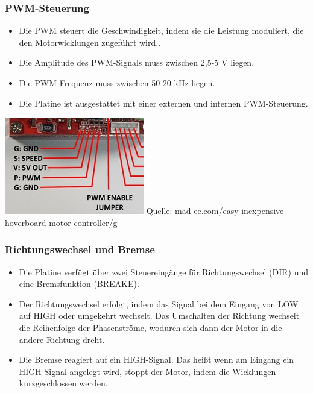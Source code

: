 \documentclass[ngerman,12pt,a4paper]{article}
\begin{document}
		\subsubsection*{PWM-Steuerung}
		\begin{itemize}
			\item Die PWM steuert die Geschwindigkeit, indem sie die Leistung moduliert, die den Motorwicklungen zugeführt wird..
			\item Die Amplitude des PWM-Signals muss zwischen 2,5-5 V liegen.
			\item Die PWM-Frequenz muss zwischen 50-20 kHz liegen.
			\item Die Platine ist ausgestattet mit einer externen und internen PWM-Steuerung.
		\end{itemize}
		
		\begin{center}
			\begin{minipage}{\textwidth}
				\centering
				\includegraphics[scale=1]{Pictures/PWM-Treiber}
				\label{fig:spiffs_init}
				\vspace{-2pt}
				\small Quelle: mad-ee.com/easy-inexpensive-hoverboard-motor-controller/g
			\end{minipage}
		\end{center}
		\newpage
		\subsubsection*{Richtungswechsel und Bremse}
		\begin{itemize}
			\item Die Platine verfügt über zwei Steuereingänge für Richtungswechsel (DIR) und eine Bremsfunktion (BREAKE).
			\item Der Richtungswechsel erfolgt, indem das Signal bei dem Eingang von LOW auf HIGH oder umgekehrt wechselt. Das Umschalten der Richtung wechselt die Reihenfolge der Phasenströme, wodurch sich dann der Motor in die andere Richtung dreht.
			\item Die Bremse reagiert auf ein HIGH-Signal. Das heißt wenn am Eingang ein HIGH-Signal angelegt wird, stoppt der Motor, indem die Wicklungen kurzgeschlossen werden.
		\end{itemize}
		
\end{document}
